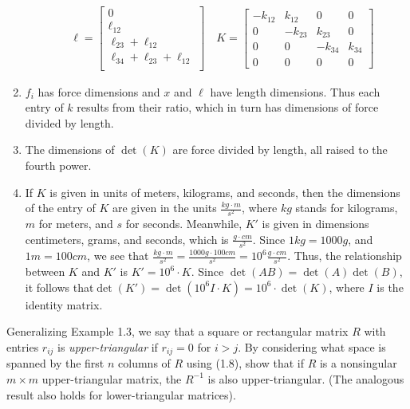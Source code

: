 \documentclass[12pt]{article}
\newenvironment{ex}[2][Exercise]{\begin{trivlist}
		\item[\hskip \labelsep {\bfseries #1}\hskip \labelsep {\bfseries #2.}]}{\end{trivlist}}
\newenvironment{sol}[1][Solution]{\begin{trivlist}
		\item[\hskip \labelsep {\bfseries #1:}]}{\end{trivlist}}
\begin{document}
\begin{sol}
\begin{enumerate}[label=(\alph*)]
\begin{align*}
			\quad
			\ell=\begin{bmatrix}
				0\\
				\ell_{12}\\
				\ell_{23} + \ell_{12}\\
				\ell_{34} + \ell_{23} + \ell_{12}\\
			\end{bmatrix}
			\quad
			K=\begin{bmatrix}
				-k_{12} & k_{12} & 0 & 0\\
				0 & -k_{23} & k_{23} & 0\\
				0 & 0 & -k_{34} & k_{34}\\
				0 & 0 & 0 & 0
			\end{bmatrix}
		\end{align*}
		\item $f_i$ has force dimensions and $x$ and $\ell$ have length dimensions.
		Thus each entry of $k$ results from their ratio, which in turn has
		dimensions of force divided by length.
		\item The dimensions of $\det(K)$ are force divided by length, all raised to
		the fourth power.
		\item If $K$ is given in units of meters, kilograms, and seconds, then the
		dimensions of the entry of $K$ are given in the units $\frac{kg\cdot m}{s^2}$,
		where $kg$ stands for kilograms, $m$ for meters, and $s$ for seconds.
		Meanwhile, $K'$ is given in dimensions centimeters, grams, and seconds, which
		is $\frac{g\cdot cm}{s^2}$. Since $1kg=1000g$, and $1m=100cm$, we see that
		$\frac{kg\cdot m}{s^2}=\frac{1000g\cdot 100cm}{s^2}=10^6\frac{g\cdot cm}{s^2}$.
		Thus, the relationship between $K$ and $K'$ is $K'=10^6\cdot K$. Since
		$\det(AB)=\det(A)\det(B)$, it follows that$\det(K')=\det(10^6I\cdot K)=10^6\cdot\det(K)$,
		where $I$ is the identity matrix.
	\end{enumerate}
\end{sol}

\begin{ex}{3}
	Generalizing Example 1.3, we say that a square or rectangular matrix $R$ with entries
	$r_{ij}$ is \emph{upper-triangular} if $r_{ij}=0$ for $i>j$. By considering what space
	is spanned by the first $n$ columns of $R$ using (1.8), show that if $R$ is a nonsingular
	$m\times m$ upper-triangular matrix, the $R^{-1}$ is also upper-triangular.
	(The analogous result also holds for lower-triangular matrices).
\end{ex}
\end{document}
